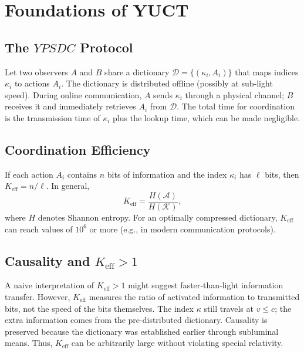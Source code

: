 \documentclass[12pt,a4paper]{article}
\newcommand{\Keff}{K_{\mathrm{eff}}}
\newcommand{\YPSDC}{YPSDC}
\begin{document}
	\section{Foundations of YUCT}
	\label{sec:foundations}
	
	\subsection{The \(\YPSDC\) Protocol}
	\label{subsec:ypsdc}
	
	Let two observers \(A\) and \(B\) share a dictionary \(\mathcal{D} = \{ (\kappa_i, A_i) \}\) that maps indices \(\kappa_i\) to actions \(A_i\). The dictionary is distributed offline (possibly at sub‑light speed). During online communication, \(A\) sends \(\kappa_i\) through a physical channel; \(B\) receives it and immediately retrieves \(A_i\) from \(\mathcal{D}\). The total time for coordination is the transmission time of \(\kappa_i\) plus the lookup time, which can be made negligible.
	
	\subsection{Coordination Efficiency}
	\label{subsec:keff}
	
	If each action \(A_i\) contains \(n\) bits of information and the index \(\kappa_i\) has \(\ell\) bits, then \(\Keff = n/\ell\). In general,
	\begin{equation}
		\Keff = \frac{H(\mathcal{A})}{H(\mathcal{K})},
	\end{equation}
	where \(H\) denotes Shannon entropy. For an optimally compressed dictionary, \(\Keff\) can reach values of \(10^6\) or more (e.g., in modern communication protocols).
	
	\subsection{Causality and \(K_{\mathrm{eff}} > 1\)}
	\label{subsec:causality}
	
	A naive interpretation of \(\Keff > 1\) might suggest faster‑than‑light information transfer. However, \(\Keff\) measures the ratio of activated information to transmitted bits, not the speed of the bits themselves. The index \(\kappa\) still travels at \(v \le c\); the extra information comes from the pre‑distributed dictionary. Causality is preserved because the dictionary was established earlier through subluminal means. Thus, \(\Keff\) can be arbitrarily large without violating special relativity.
	
\end{document}
